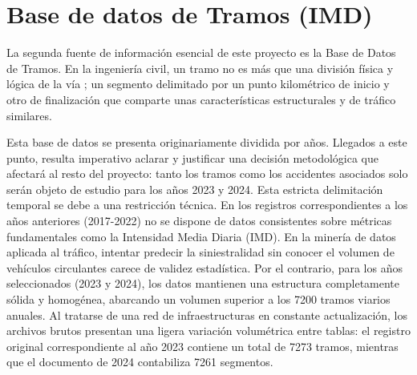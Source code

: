 \documentclass[twoside,a4paper,12pt,onecolumn,openany]{book}
\begin{document}
\begin{table}[htbp]
\centering
\caption{Muestra de las primeras filas de la Base de Datos de Accidentes en bruto.}
\vspace{0.3cm}
\label{tab:accidentes_muestra}
\end{table}

\section{Base de datos de Tramos (IMD)}

La segunda fuente de información esencial de este proyecto es la Base de Datos de Tramos. En la ingeniería civil, un tramo no es más que una división física y lógica de la vía \cite{ingenieriacarreteras}; un segmento delimitado por un punto kilométrico de inicio y otro de finalización que comparte unas características estructurales y de tráfico similares. 

\vspace{0.5cm}

Esta base de datos se presenta originariamente dividida por años. Llegados a este punto, resulta imperativo aclarar y justificar una decisión metodológica que afectará al resto del proyecto: tanto los tramos como los accidentes asociados solo serán objeto de estudio para los años 2023 y 2024. Esta estricta delimitación temporal se debe a una restricción técnica. En los registros correspondientes a los años anteriores (2017-2022) no se dispone de datos consistentes sobre métricas fundamentales como la Intensidad Media Diaria (IMD). En la minería de datos aplicada al tráfico, intentar predecir la siniestralidad sin conocer el volumen de vehículos circulantes carece de validez estadística. Por el contrario, para los años seleccionados (2023 y 2024), los datos mantienen una estructura completamente sólida y homogénea, abarcando un volumen superior a los 7200 tramos viarios anuales. Al tratarse de una red de infraestructuras en constante actualización, los archivos brutos presentan una ligera variación volumétrica entre tablas: el registro original correspondiente al año 2023 contiene un total de 7273 tramos, mientras que el documento de 2024 contabiliza 7261 segmentos.
\end{document}

